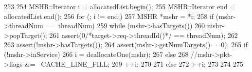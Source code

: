 \begin{DoxyCode}
253 {
254     MSHR::Iterator i = allocatedList.begin();
255     MSHR::Iterator end = allocatedList.end();
256     for (; i != end;) {
257         MSHR *mshr = *i;
258         if (mshr->threadNum == threadNum) {
259             while (mshr->hasTargets()) {
260                 mshr->popTarget();
261                 assert(0/*target->req->threadId()*/ == threadNum);
262             }
263             assert(!mshr->hasTargets());
264             assert(mshr->getNumTargets()==0);
265             if (!mshr->inService) {
266                 i = deallocateOne(mshr);
267             } else {
268                 //mshr->pkt->flags &= ~CACHE_LINE_FILL;
269                 ++i;
270             }
271         } else {
272             ++i;
273         }
274     }
275 }
\end{DoxyCode}



